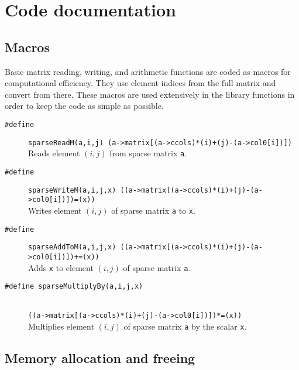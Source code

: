 \documentclass[11pt]{article}
\newcommand {\ttt} {\texttt}
\begin{document}
\section{Code documentation}

\subsection{Macros}

Basic matrix reading, writing, and arithmetic functions are coded as macros for computational efficiency. They use element indices from the full matrix and convert from there. These macros are used extensively in the library functions in order to keep the code as simple as possible.

\begin{description}

\item[\ttt{\#define}]
\verb!sparseReadM(a,i,j) (a->matrix[(a->ccols)*(i)+(j)-(a->col0[i])])!
\hfill \\
Reads element $(i,j)$ from sparse matrix \ttt{a}.

\item[\ttt{\#define}]
\verb!sparseWriteM(a,i,j,x) ((a->matrix[(a->ccols)*(i)+(j)-(a->col0[i])])=(x))!
\hfill \\
Writes element $(i,j)$ of sparse matrix \ttt{a} to \ttt{x}.

\item[\ttt{\#define}]
\verb!sparseAddToM(a,i,j,x) ((a->matrix[(a->ccols)*(i)+(j)-(a->col0[i])])+=(x))!
\hfill \\
Adds \ttt{x} to element $(i,j)$ of sparse matrix \ttt{a}.

\item[\ttt{\#define sparseMultiplyBy(a,i,j,x)}] \hfill \\
\verb!((a->matrix[(a->ccols)*(i)+(j)-(a->col0[i])])*=(x))!
\hfill \\
Multiplies element $(i,j)$ of sparse matrix \ttt{a} by the scalar \ttt{x}.

\end{description}


\subsection{Memory allocation and freeing}
\end{document}
